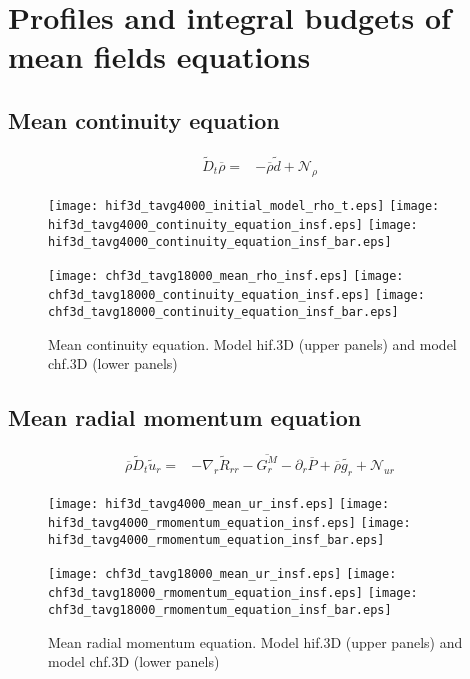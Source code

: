 \documentclass[10pt,paper=a4]{report}
\newcommand{\fav}{\widetilde}
\newcommand{\av}{\overline}
\begin{document}
\newpage

\section{Profiles and integral budgets of mean fields equations}

\subsection{Mean continuity equation}

\begin{align}
\fav{D}_t \av{\rho} =& -\av{\rho} \fav{d} + {\mathcal N_\rho}  
\end{align}

\begin{figure}[!h]
\centerline{
\texttt{[image: hif3d\_tavg4000\_initial\_model\_rho\_t.eps]}
\texttt{[image: hif3d\_tavg4000\_continuity\_equation\_insf.eps]}
\texttt{[image: hif3d\_tavg4000\_continuity\_equation\_insf\_bar.eps]}}

\centerline{
\texttt{[image: chf3d\_tavg18000\_mean\_rho\_insf.eps]}
\texttt{[image: chf3d\_tavg18000\_continuity\_equation\_insf.eps]}
\texttt{[image: chf3d\_tavg18000\_continuity\_equation\_insf\_bar.eps]}}
\caption{Mean continuity equation. Model {\sf hif.3D} (upper panels) and model {\sf chf.3D} (lower panels)}
\end{figure}

\newpage

\subsection{Mean radial momentum equation}

\begin{align}
\av{\rho}\fav{D}_t\fav{u}_r = & -\nabla_r \fav{R}_{rr} -\av{G^{M}_r} - \partial_r \av{P} + \av{\rho}\fav{g_r} + {\mathcal N_{ur}}
\end{align}

\begin{figure}[!h]
\centerline{
\texttt{[image: hif3d\_tavg4000\_mean\_ur\_insf.eps]}
\texttt{[image: hif3d\_tavg4000\_rmomentum\_equation\_insf.eps]}
\texttt{[image: hif3d\_tavg4000\_rmomentum\_equation\_insf\_bar.eps]}}

\centerline{
\texttt{[image: chf3d\_tavg18000\_mean\_ur\_insf.eps]}
\texttt{[image: chf3d\_tavg18000\_rmomentum\_equation\_insf.eps]}
\texttt{[image: chf3d\_tavg18000\_rmomentum\_equation\_insf\_bar.eps]}}
\caption{Mean radial momentum equation. Model {\sf hif.3D} (upper panels) and model {\sf chf.3D} (lower panels)}
\end{figure}
\end{document}
